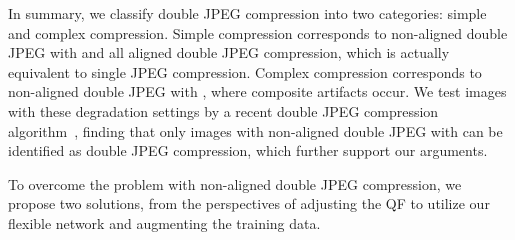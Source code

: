 \documentclass[10pt,twocolumn,letterpaper]{article}
\begin{document}
In summary, we classify double JPEG compression into two categories: simple and complex compression. Simple compression corresponds to non-aligned double JPEG with    and all aligned double JPEG compression, which is actually equivalent to single JPEG compression. Complex compression corresponds to non-aligned double JPEG with   , where composite artifacts occur. We test images with these degradation settings by a recent double JPEG compression algorithm~\cite{park2018double}, finding that only images with non-aligned double JPEG with    can be identified as double JPEG compression, which further support our arguments.

To overcome the problem with non-aligned double JPEG compression, we propose two solutions, from the perspectives of adjusting the QF to utilize our flexible network and augmenting the training data.
\end{document}
